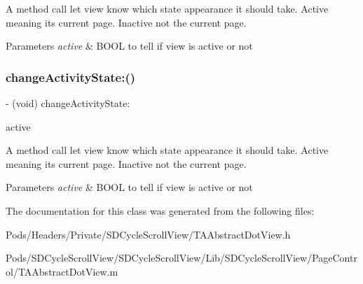 A method call let view know which state appearance it should take. Active meaning it\textquotesingle{}s current page. Inactive not the current page.


\begin{DoxyParams}{Parameters}
{\em active} & B\+O\+OL to tell if view is active or not \\
\hline
\end{DoxyParams}
\mbox{\label{interface_t_a_abstract_dot_view_a980afa16977f7956129faeb494dfc760}} 
\subsubsection{\texorpdfstring{change\+Activity\+State\+:()}{changeActivityState:()}\hspace{0.1cm}{\footnotesize\ttfamily [3/3]}}
{\footnotesize\ttfamily -\/ (void) change\+Activity\+State\+: \begin{DoxyParamCaption}\item[{(B\+O\+OL)}]{active }\end{DoxyParamCaption}}

A method call let view know which state appearance it should take. Active meaning it\textquotesingle{}s current page. Inactive not the current page.


\begin{DoxyParams}{Parameters}
{\em active} & B\+O\+OL to tell if view is active or not \\
\hline
\end{DoxyParams}


The documentation for this class was generated from the following files\+:\begin{DoxyCompactItemize}
\item 
Pods/\+Headers/\+Private/\+S\+D\+Cycle\+Scroll\+View/T\+A\+Abstract\+Dot\+View.\+h\item 
Pods/\+S\+D\+Cycle\+Scroll\+View/\+S\+D\+Cycle\+Scroll\+View/\+Lib/\+S\+D\+Cycle\+Scroll\+View/\+Page\+Control/T\+A\+Abstract\+Dot\+View.\+m\end{DoxyCompactItemize}
